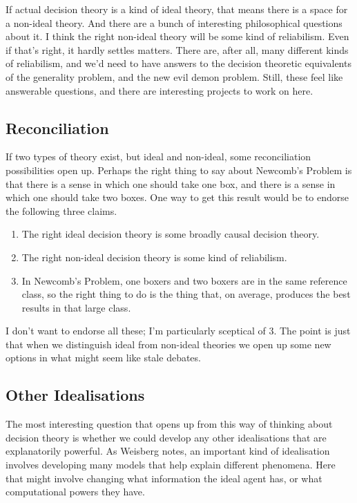 \documentclass[
  11pt,
  letterpaper,
  DIV=11,
  numbers=noendperiod,
  twoside]{scrartcl}
\providecommand{\tightlist}{%
  \setlength{\itemsep}{0pt}\setlength{\parskip}{0pt}}
\begin{document}
If actual decision theory is a kind of ideal theory, that means there is
a space for a non-ideal theory. And there are a bunch of interesting
philosophical questions about it. I think the right non-ideal theory
will be some kind of reliabilism. Even if that's right, it hardly
settles matters. There are, after all, many different kinds of
reliabilism, and we'd need to have answers to the decision theoretic
equivalents of the generality problem, and the new evil demon problem.
Still, these feel like answerable questions, and there are interesting
projects to work on here.

\subsection{Reconciliation}\label{reconciliation}

If two types of theory exist, but ideal and non-ideal, some
reconciliation possibilities open up. Perhaps the right thing to say
about Newcomb's Problem is that there is a sense in which one should
take one box, and there is a sense in which one should take two boxes.
One way to get this result would be to endorse the following three
claims.

\begin{enumerate}
\def\labelenumi{\arabic{enumi}.}
\tightlist
\item
  The right ideal decision theory is some broadly causal decision
  theory.
\item
  The right non-ideal decision theory is some kind of reliabilism.
\item
  In Newcomb's Problem, one boxers and two boxers are in the same
  reference class, so the right thing to do is the thing that, on
  average, produces the best results in that large class.
\end{enumerate}

I don't want to endorse all these; I'm particularly sceptical of 3. The
point is just that when we distinguish ideal from non-ideal theories we
open up some new options in what might seem like stale debates.

\subsection{Other Idealisations}\label{other-idealisations}

The most interesting question that opens up from this way of thinking
about decision theory is whether we could develop any other
idealisations that are explanatorily powerful. As Weisberg notes, an
important kind of idealisation involves developing many models that help
explain different phenomena. Here that might involve changing what
information the ideal agent has, or what computational powers they have.
\end{document}
